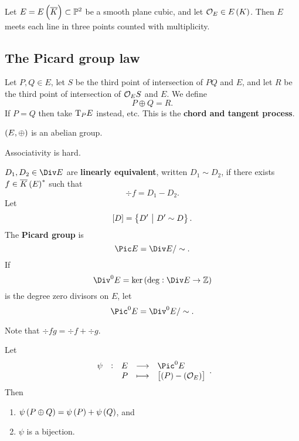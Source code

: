 Let $ E = E\br{\overline{K}} \subset \PP^2 $ be a smooth plane cubic, and let $ \OOO_E \in E\br{K} $. Then $ E $ meets each line in three points counted with multiplicity.

\subsection{The Picard group law}

Let $ P, Q \in E $, let $ S $ be the third point of intersection of $ PQ $ and $ E $, and let $ R $ be the third point of intersection of $ \mathcal{O}_ES $ and $ E $. We define
$$ P \oplus Q = R. $$
If $ P = Q $ then take $ \mathrm{T}_PE $ instead, etc. This is the \textbf{chord and tangent process}.

\begin{theorem}
\label{thm:4.1}
$ \br{E, \oplus} $ is an abelian group.
\end{theorem}

Associativity is hard.

\begin{definition*}
$ D_1, D_2 \in \Div E $ are \textbf{linearly equivalent}, written $ D_1 \sim D_2 $, if there exists $ f \in \overline{K}\br{E}^* $ such that
$$ \div f = D_1 - D_2. $$
Let
$$ \sbr{D} = \cbr{D' \st D' \sim D}. $$
The \textbf{Picard group} is
$$ \Pic E = \Div E / \sim. $$
If
$$ \Div^0 E = \ker \br{\deg : \Div E \to \ZZ} $$
is the degree zero divisors on $ E $, let
$$ \Pic^0 E = \Div^0 E / \sim. $$
\end{definition*}

Note that $ \div fg = \div f + \div g $.

\begin{proposition}
\label{prop:4.2}
Let
$$ \function[\psi]{E}{\Pic^0 E}{P}{\sbr{\br{P} - \br{\OOO_E}}}. $$
Then
\begin{enumerate}
\item $ \psi\br{P \oplus Q} = \psi\br{P} + \psi\br{Q} $, and
\item $ \psi $ is a bijection.
\end{enumerate}
\end{proposition}


